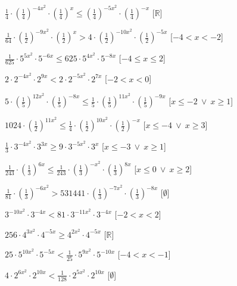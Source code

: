 \begin{esercizio}
\begin{enumeratea}
  \item  \(\frac{1}{4} \cdot \left(\frac{1}{4}\right)^{{-4x^2}} \cdot 
\left(\frac{1}{4}\right)^{{x}} \leqslant \left(\frac{1}{4}\right)^{{-5x^2}} 
\cdot \left(\frac{1}{4}\right)^{{-x}}\)
   \hfill [\(\mathbb{R}\)]
  \item  \(\frac{1}{64} \cdot \left(\frac{1}{2}\right)^{{-9x^2}} \cdot 
\left(\frac{1}{2}\right)^{{x}} > 4 \cdot \left(\frac{1}{2}\right)^{{-10x^2}} 
\cdot \left(\frac{1}{2}\right)^{{-5x}}\)
   \hfill [\(-4 < x < -2\)]
  \item  \(\frac{1}{625} \cdot 5^{{5x^2}} \cdot 5^{{-6x}} \leqslant 625 \cdot 
5^{{4x^2}} \cdot 5^{{-8x}}\)
   \hfill [\(-4 \leqslant x \leqslant 2\)]
  \item  \(2 \cdot 2^{{-4x^2}} \cdot 2^{{9x}} < 2 \cdot 2^{{-5x^2}} \cdot 
2^{{7x}}\)
   \hfill [\(-2 < x < 0\)]
  \item  \(5 \cdot \left(\frac{1}{5}\right)^{{12x^2}} \cdot 
\left(\frac{1}{5}\right)^{{-8x}} \leqslant \frac{1}{5} \cdot 
\left(\frac{1}{5}\right)^{{11x^2}} \cdot \left(\frac{1}{5}\right)^{{-9x}}\)
   \hfill [\(x \leqslant -2~\vee~x \geqslant 1\)]
  \item  \(1024 \cdot \left(\frac{1}{2}\right)^{{11x^2}} \leqslant \frac{1}{4} 
\cdot \left(\frac{1}{2}\right)^{{10x^2}} \cdot \left(\frac{1}{2}\right)^{{-x}}\)
   \hfill [\(x \leqslant -4~\vee~x \geqslant 3\)]
  \item  \(\frac{1}{3} \cdot 3^{{-4x^2}} \cdot 3^{{3x}} \geqslant 9 \cdot 
3^{{-5x^2}} \cdot 3^{{x}}\)
   \hfill [\(x \leqslant -3~\vee~x \geqslant 1\)]
  \item  \(\frac{1}{243} \cdot \left(\frac{1}{3}\right)^{{6x}} \leqslant 
\frac{1}{243} \cdot \left(\frac{1}{3}\right)^{{-x^2}} \cdot 
\left(\frac{1}{3}\right)^{{8x}}\)
   \hfill [\(x \leqslant 0~\vee~x \geqslant 2\)]
  \item  \(\frac{1}{81} \cdot \left(\frac{1}{3}\right)^{{-6x^2}} > 531441 \cdot 
\left(\frac{1}{3}\right)^{{-7x^2}} \cdot \left(\frac{1}{3}\right)^{{-8x}}\)
   \hfill [\(\emptyset\)]
  \item  \(3^{{-10x^2}} \cdot 3^{{-4x}} < 81 \cdot 3^{{-11x^2}} \cdot 
3^{{-4x}}\)
   \hfill [\(-2 < x < 2\)]
  \item  \(256 \cdot 4^{{3x^2}} \cdot 4^{{-5x}} \geqslant 4^{{2x^2}} \cdot 
4^{{-5x}}\)
   \hfill [\(\mathbb{R}\)]
  \item  \(25 \cdot 5^{{10x^2}} \cdot 5^{{-5x}} < \frac{1}{25} \cdot 5^{{9x^2}} 
\cdot 5^{{-10x}}\)
   \hfill [\(-4 < x < -1\)]
  \item  \(4 \cdot 2^{{6x^2}} \cdot 2^{{10x}} < \frac{1}{128} \cdot 2^{{5x^2}} 
\cdot 2^{{10x}}\)
   \hfill [\(\emptyset\)]
 \end{enumeratea}
\end{esercizio}


